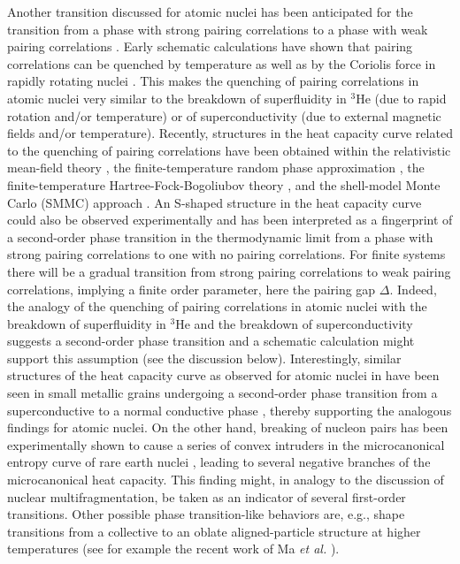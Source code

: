 \documentclass[rmp,preprint,aps,floatfix]{revtex4}
\begin{document}
Another transition discussed for atomic nuclei has been anticipated 
for the transition from a phase with strong pairing correlations to a phase 
with weak pairing correlations \cite{SY63}. Early schematic calculations have 
shown that pairing correlations can be quenched by temperature as well as by 
the Coriolis force in rapidly 
rotating nuclei \cite{Go81a,Go81b,TS80,TS82,shimizu89}. 
This makes the quenching of pairing correlations in atomic nuclei very similar 
to the breakdown of superfluidity in $^3$He (due to rapid rotation and/or 
temperature) or of superconductivity (due to external magnetic fields and/or 
temperature). Recently, structures in the heat capacity curve related to the 
quenching of pairing correlations have been obtained within the relativistic 
mean-field theory \cite{AT00,AT01}, the finite-temperature random phase 
approximation \cite{Ng90}, the finite-temperature Hartree-Fock-Bogoliubov 
theory \cite{ER00}, and the shell-model Monte Carlo (SMMC) approach 
\cite{DK95a,NA97,RH98,WK00,liu01}. An S-shaped structure in the heat capacity 
curve could also be observed experimentally \cite{schiller2001} and has been 
interpreted as a fingerprint of a second-order phase 
transition in the thermodynamic limit from a phase 
with strong pairing correlations to one with no pairing correlations. For finite systems
there will be a gradual transition from strong pairing correlations to weak pairing 
correlations, implying a finite order parameter, here the pairing gap $\Delta$.
Indeed, the analogy of the quenching of pairing correlations in atomic nuclei 
with the breakdown of superfluidity in $^3$He and the breakdown of 
superconductivity suggests a second-order phase transition and a schematic 
calculation might support this assumption (see the discussion below). 
Interestingly, similar 
structures of the heat capacity curve as observed for atomic nuclei in 
\cite{schiller2001} have been seen in 
small metallic grains undergoing a second-order 
phase transition from a superconductive to a normal conductive phase 
\cite{tinkham95,tinkham96,tinkham98,delft2000,LA93}, thereby supporting the analogous findings for atomic nuclei. On 
the other hand, breaking of nucleon pairs has been experimentally shown to 
cause a series of convex intruders in the microcanonical entropy curve of rare 
earth nuclei \cite{oslo3,MG01}, leading to several negative branches of the 
microcanonical heat capacity. 
This finding might, in analogy to the discussion 
of nuclear multifragmentation, be taken as an indicator of several first-order
transitions.
Other possible phase transition-like behaviors are, e.g., shape transitions
from a collective to an oblate aligned-particle structure 
at higher temperatures (see for example the recent work of Ma {\em et al.}
\cite{tenglek2000}).
\end{document}
